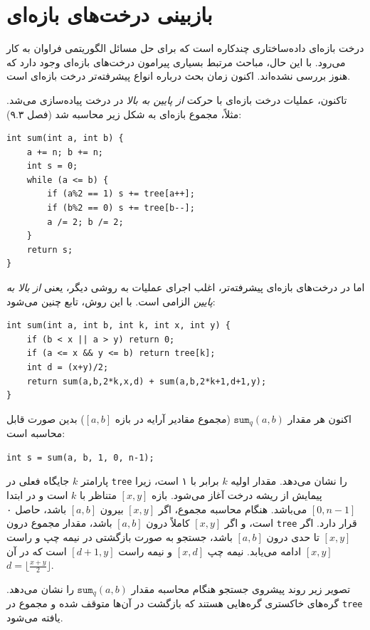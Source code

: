 \chapter{بازبینی درخت‌های بازه‌ای}


درخت بازه‌ای داده‌ساختاری چندکاره است
که برای حل مسائل الگوریتمی فراوان به کار می‌رود.
با این حال، مباحث مرتبط بسیاری پیرامون درخت‌های بازه‌ای وجود دارد
که هنوز بررسی نشده‌اند.
اکنون زمان بحث درباره انواع پیشرفته‌تر
درخت بازه‌ای است.

تاکنون، عملیات درخت بازه‌ای
با حرکت \emph{از پایین به بالا}
در درخت پیاده‌سازی می‌شد.
مثلاً، مجموع بازه‌ای
به شکل زیر محاسبه شد (فصل ۹.۳):

\begin{lstlisting}
int sum(int a, int b) {
    a += n; b += n;
    int s = 0;
    while (a <= b) {
        if (a%2 == 1) s += tree[a++];
        if (b%2 == 0) s += tree[b--];
        a /= 2; b /= 2;
    }
    return s;
}
\end{lstlisting}

اما در درخت‌های بازه‌ای پیشرفته‌تر،
اغلب اجرای عملیات به روشی دیگر،
یعنی \emph{از بالا به پایین} الزامی است.
با این روش، تابع چنین می‌شود:
\begin{lstlisting}
int sum(int a, int b, int k, int x, int y) {
    if (b < x || a > y) return 0;
    if (a <= x && y <= b) return tree[k];
    int d = (x+y)/2;
    return sum(a,b,2*k,x,d) + sum(a,b,2*k+1,d+1,y);
}
\end{lstlisting}

اکنون هر مقدار $\texttt{sum}_q(a,b)$
(مجموع مقادیر آرایه در بازه $[a,b]$) بدین صورت قابل محاسبه است:
\begin{lstlisting}
int s = sum(a, b, 1, 0, n-1);
\end{lstlisting}

پارامتر $k$ جایگاه فعلی
در \texttt{tree} را نشان می‌دهد.
مقدار اولیه $k$ برابر با ۱ است، زیرا پیمایش
از ریشه درخت آغاز می‌شود.
بازه $[x,y]$ متناظر با $k$ است
و در ابتدا $[0,n-1]$ می‌باشد.
هنگام محاسبه مجموع،
اگر $[x,y]$ بیرون $[a,b]$ باشد،
حاصل ۰ است،
و اگر $[x,y]$ کاملاً درون $[a,b]$ باشد،
مقدار مجموع درون \texttt{tree} قرار دارد.
اگر $[x,y]$ تا حدی درون $[a,b]$ باشد،
جستجو به صورت بازگشتی در نیمه چپ
و راست $[x,y]$ ادامه می‌یابد.
نیمه چپ $[x,d]$
و نیمه راست $[d+1,y]$ است
که در آن $d=\lfloor \frac{x+y}{2} \rfloor$.

تصویر زیر روند پیشروی جستجو
هنگام محاسبه مقدار $\texttt{sum}_q(a,b)$ را نشان می‌دهد.
گره‌های خاکستری گره‌هایی هستند که بازگشت
در آن‌ها متوقف شده و مجموع در \texttt{tree} یافته می‌شود.

